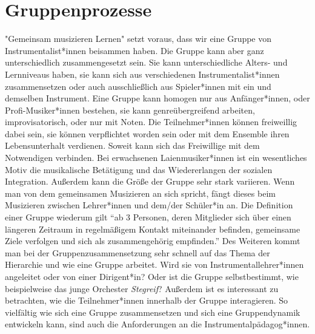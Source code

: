 \section{Gruppenprozesse}
"Gemeinsam musizieren Lernen" setzt voraus, dass wir eine Gruppe von
Instrumentalist*innen beisammen haben. Die Gruppe kann aber ganz unterschiedlich
zusammengesetzt sein. Sie kann unterschiedliche Alters- und Lernniveaus haben,
sie kann sich aus verschiedenen Instrumentalist*innen zusammensetzen oder auch
ausschließlich aus Spieler*innen mit ein und demselben Instrument. Eine Gruppe
kann homogen nur aus Anfänger*innen, oder Profi-Musiker*innen bestehen, sie kann
genreübergreifend arbeiten, improvisatorisch, oder nur mit Noten. Die
Teilnehmer*innen können freiweillig dabei sein, sie können verpflichtet worden
sein oder mit dem Ensemble ihren Lebensunterhalt verdienen. Soweit kann sich das
Freiwillige mit dem Notwendigen verbinden. Bei erwachsenen Laienmusiker*innen
ist ein wesentliches Motiv die musikalische Betätigung und das Wiedererlangen
der sozialen Integration. Außerdem kann die Größe der Gruppe sehr stark
variieren. Wenn man von dem gemeinsamen Musizieren an sich spricht, fängt dieses
beim Musizieren zwischen Lehrer*innen und dem/der Schüler*in an. Die Definition
einer Gruppe wiederum gilt \enquote{ab 3 Personen, deren Mitglieder sich über
einen längeren Zeitraum in regelmäßigem Kontakt miteinander befinden, gemeinsame
Ziele verfolgen und sich als zusammengehörig empfinden.}
\autocite{wikipedia:gruppe}
Des Weiteren kommt man bei der Gruppenzusammensetzung sehr schnell auf das Thema
der Hierarchie und wie eine Gruppe arbeitet. Wird sie von
Instrumentallehrer*innen angeleitet oder von einer Dirigent*in? Oder ist die
Gruppe selbstbestimmt, wie beispielweise das junge Orchester \emph{Stegreif}?
Außerdem ist es interessant zu betrachten, wie die Teilnehmer*innen innerhalb
der Gruppe interagieren. So vielfältig wie sich eine Gruppe zusammensetzen und
sich eine Gruppendynamik entwickeln kann, sind auch die Anforderungen an die
Instrumentalpädagog*innen.


